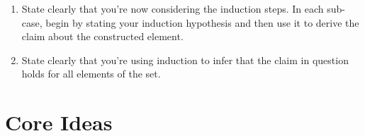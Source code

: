 \begin{enumerate}[{\thesection}.1]
\begin{enumerate}[1.]
			\item State clearly that you're now considering the induction steps. In each sub-case, begin by stating your induction hypothesis and then use it to derive the claim about the constructed element.
			
			\item State clearly that you're using induction to infer that the claim in question holds for all elements of the set.
		
		\end{enumerate}
		
\end{enumerate}

\section{Core Ideas}

